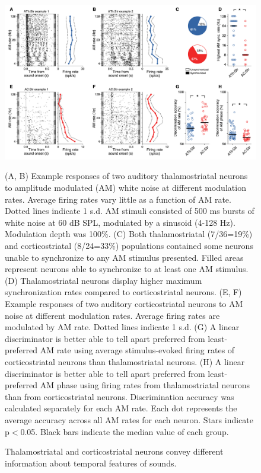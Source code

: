 \begin{figure}[hp]
  \begin{center}
    \includegraphics[width=6in]{figures/chapter3/fig5_am}%
  \end{center}
\caption{Thalamostriatal and corticostriatal neurons convey different information about temporal features of sounds.}{(A, B) Example responses of two auditory thalamostriatal neurons to amplitude modulated (AM) white noise at different modulation rates. 
%
Average firing rates vary little as a function of AM rate. 
%
Dotted lines indicate 1 s.d.
%
AM stimuli consisted of 500 ms bursts of white noise at 60 dB SPL, modulated by a sinusoid (4-128 Hz).
%
Modulation depth was 100\%. 
%
(C) Both thalamostriatal (7/36=19\%) and corticostriatal (8/24=33\%) populations contained some neurons unable to synchronize to any AM stimulus presented. 
%
Filled areas represent neurons able to synchronize to at least one AM stimulus.
%
(D) Thalamostriatal neurons display higher maximum synchronization rates compared to corticostriatal neurons.
%
(E, F) Example responses of two auditory corticostriatal neurons to AM noise at different modulation rates. 
%
Average firing rates are modulated by AM rate. 
%
Dotted lines indicate 1 s.d.
%
(G) A linear discriminator is better able to tell apart preferred from least-preferred AM rate using average stimulus-evoked firing rates of corticostriatal neurons than thalamostriatal neurons. 
%
(H) A linear discriminator is better able to tell apart preferred from least-preferred AM phase using firing rates from thalamostriatal neurons than from corticostriatal neurons. Discrimination accuracy was calculated separately for each AM rate. Each dot represents the average accuracy across all AM rates for each neuron.
%
Stars indicate p$<$0.05. Black bars indicate the median value of each group. 
}
\end{figure}

